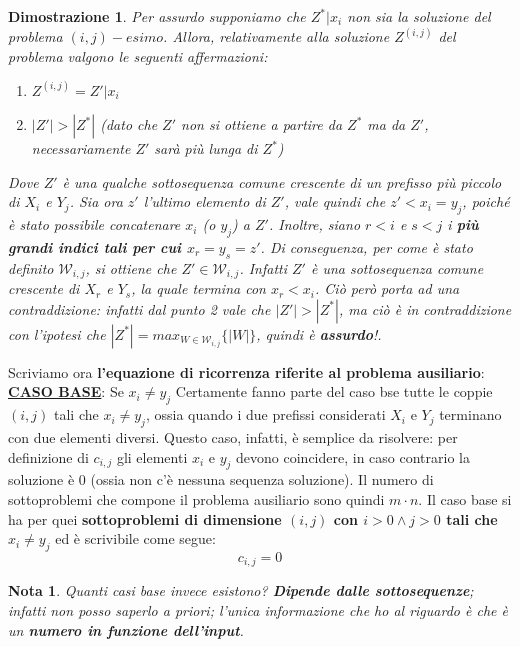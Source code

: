 \documentclass[12pt]{article}
\newtheorem{Dimostrazione}{Dimostrazione}[subsection]
\newtheorem{Nota}{Nota}[subsection]
\begin{document}
\begin{Dimostrazione}
    Per assurdo supponiamo che $Z^*|x_i$ non sia la soluzione del problema $(i,j)-esimo$. Allora, relativamente alla soluzione $Z^{(i,j)}$ del problema valgono le seguenti affermazioni:
    \begin{enumerate}
        \item $Z^{(i,j)} = Z'|x_i$
        \item $|Z'| > |Z^*|$ (dato che $Z'$ non si ottiene a partire da $Z^*$ ma da $Z'$, necessariamente $Z'$ sarà più lunga di $Z^*$)
    \end{enumerate}
    Dove $Z'$ è una qualche sottosequenza comune crescente di un prefisso più piccolo di $X_i$ e $Y_j$. Sia ora $z'$ l'ultimo elemento di $Z'$, vale quindi che $z' < x_i =y_j$, poiché
    è stato possibile concatenare $x_i$ (o $y_j$) a $Z'$. Inoltre, siano $r < i$ e $s < j$ i \textbf{più grandi indici tali per cui $x_r = y_s = z'$}. Di conseguenza, per come è stato definito $\mathcal{W}_{i,j}$, si ottiene che $Z' \in \mathcal{W}_{i,j}$. Infatti
    $Z'$ è una sottosequenza comune crescente di $X_r$ e $Y_s$, la quale termina con $x_r < x_i$. Ciò però porta ad una contraddizione: infatti dal punto 2 vale che $|Z'| > |Z^*|$, ma ciò è in contraddizione con l'ipotesi che $|Z^*| = max_{W \in \mathcal{W}_{i,j}}\{|W|\}$,
    quindi è \textbf{assurdo}!.
\end{Dimostrazione}
Scriviamo ora \textbf{l'equazione di ricorrenza riferite al problema ausiliario}: \newline
\textbf{\underline{CASO BASE}}: Se $x_i \neq y_j$ \newline
Certamente fanno parte del caso bse tutte le coppie $(i,j)$ tali che $x_i \neq y_j$, ossia quando i due prefissi considerati $X_i$ e $Y_j$ terminano con due elementi diversi.
Questo caso, infatti, è semplice da risolvere: per definizione di $c_{i,j}$ gli elementi $x_i$ e $y_j$ devono coincidere, in caso contrario la soluzione è 0 (ossia non c'è nessuna sequenza soluzione).
Il numero di sottoproblemi che compone il problema ausiliario sono quindi $m \cdot n$. Il caso base si ha per quei \textbf{sottoproblemi di dimensione $(i,j)$ con $i > 0 \land j > 0$ tali che $x_i \neq y_j$} ed è scrivibile come segue:
$$c_{i,j} = 0$$
\begin{Nota}
    Quanti casi base invece esistono? \textbf{Dipende dalle sottosequenze}; infatti non posso saperlo a priori; l'unica informazione che ho al riguardo è che è un \textbf{numero in funzione dell'input}.
\end{Nota} \noindent
\end{document}
